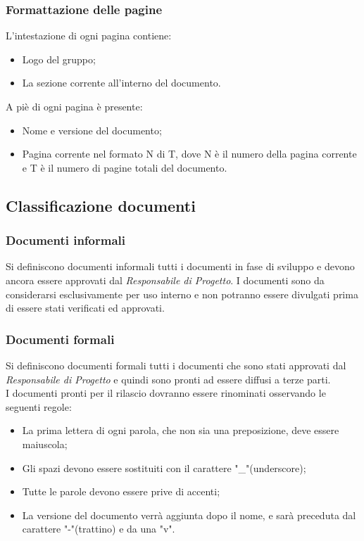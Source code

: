 \subsubsection{Formattazione delle pagine}
L'intestazione di ogni pagina contiene:
\begin{itemize}
	\item Logo del gruppo;
	\item La sezione corrente all'interno del documento.
\end{itemize}
A piè di ogni pagina è presente:
\begin{itemize}
	\item Nome e versione del documento;
	\item Pagina corrente nel formato N di T, dove N è il numero della pagina corrente e T è il numero di pagine totali del documento.
\end{itemize}

\subsection{Classificazione documenti}
\subsubsection{Documenti informali}
Si definiscono documenti informali tutti i documenti in fase di sviluppo e devono ancora essere approvati dal \textit{Responsabile di Progetto}. I documenti sono da considerarsi esclusivamente per uso interno e non potranno essere divulgati prima di essere stati verificati ed approvati. 
\subsubsection{Documenti formali}
Si definiscono documenti formali tutti i documenti che sono stati approvati dal \textit{Responsabile di Progetto} e quindi sono pronti ad essere diffusi a terze parti.\\
I documenti pronti per il rilascio dovranno essere rinominati osservando le seguenti regole:
\begin{itemize}
	\item La prima lettera di ogni parola, che non sia una preposizione, deve essere maiuscola;
	\item Gli spazi devono essere sostituiti con il carattere "\_"(underscore);
	\item Tutte le parole devono essere prive di accenti;
	\item La versione del documento verrà aggiunta dopo il nome, e sarà preceduta dal carattere "-"(trattino) e da una "v".
\end{itemize}

